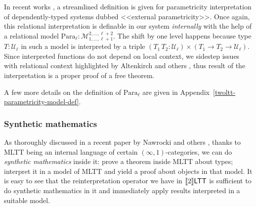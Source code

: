 In recent works \cite{Bernardy:Parametricity2010,
Altenkirch:Parametricity2024}, a streamlined definition
is given for parametricity interpretation of
dependently-typed systems dubbed <<external
parametricity>>. Once again, this relational
interpretation is definable in our system
\textit{internally} with the help of a relational model
$\mathrm{Para}_\ell:\mathcal{M}_{1,\ldots,\ell+1}^{2,
\ldots,\ell+2}$. The shift by one level happens because
type $T:\mathcal{U}_\ell$ in such a model is
interpreted by a triple $(T_1\,T_2:\mathcal{U}_\ell)
\times(T_1\to T_2\to\mathcal{U}_\ell)$. Since
interpreted functions do not depend on local context,
we sidestep issues with relational context highlighted
by Altenkirch and others
\cite{Altenkirch:Parametricity2024}, thus result of the
interpretation is a proper proof of a free theorem.

A few more details on the definition of
$\mathrm{Para}_\ell$ are given in
Appendix~\ref{twoltt-parametricity-model-def}.

\subsubsection{Synthetic mathematics}
\label{twoLTT-synthetic}

As thoroughly discussed in a recent paper by Nawrocki
and others \cite{Nawrocki:Lean2026}, thanks to MLTT
being an internal language of certain
$(\infty,1)$-categories, we can do \textit{synthetic
mathematics} inside it: prove a theorem inside MLTT
about types; interpret it in a model of MLTT and yield
a proof about objects in that model. It is easy to see
that the reinterpretation operator we have in $\llbracket 2\rrbracket\mathsf{LTT}$ is
sufficient to do synthetic mathematics in it and
immediately apply results interpreted in a suitable
model.
